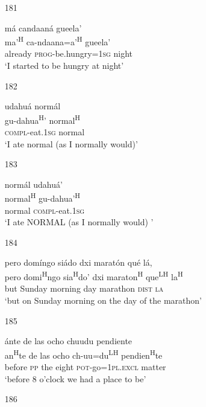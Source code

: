 \begin{itemize}
\item[181]
 
\glll m\'{a} candaan\'{a} gueela'\\
ma'\textsuperscript{H} ca-ndaana=a'\textsuperscript{H} gueela'\\
already \textsc{prog}-be.hungry=\textsc{1sg} night\\
\glt `I started to be hungry at night'



\item[182] 

\glll udahu\'{a} norm\'{a}l\\
 gu-dahua\textsuperscript{H}' normal\textsuperscript{H}\\
\textsc{compl}-eat.\textsc{1sg} normal \\
\glt `I ate normal (as I normally would)'


\item[183] 

\glll norm\'{a}l udahu\'{a}'\\
normal\textsuperscript{H} gu-dahua'\textsuperscript{H}\\
normal \textsc{compl}-eat.\textsc{1sg}\\
\glt `I ate NORMAL (as I normally would) '




\item[184]
 
\glll   pero dom\'{i}ngo si\'{a}do dxi marat\'{o}n qu\'{e} l\'{a}, \\
pero domi\textsuperscript{H}ngo sia\textsuperscript{H}do' dxi maraton\textsuperscript{H} que\textsuperscript{LH} la\textsuperscript{H}\\
but Sunday morning day marathon \textsc{dist} \textsc{la}\\
\glt `but on Sunday morning on the day of the marathon'
 


\item[185]
 
\glll  \'{a}nte de las ocho chuudu pendiente\\
an\textsuperscript{H}te de las ocho ch-uu=du\textsuperscript{LH} pendien\textsuperscript{H}te\\
before \textsc{pp} the eight \textsc{pot}-go=\textsc{1pl.excl} matter\\
\glt `before 8 o'clock we had a place to be'
 


\item[186]


\end{itemize}
